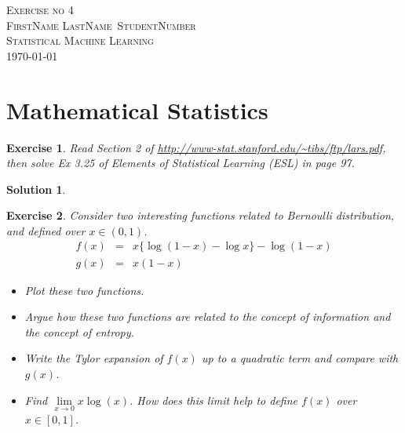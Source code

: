 \documentclass[12pt,a4paper]{article}
\def\StudentName{FirstName LastName}
\def\StudentMatricule{StudentNumber}
\def\ExerciseNo{4}
\newtheorem{exercise}{Exercise}
\numberwithin{exercise}{section} %
\newtheorem{solution}{Solution}
\numberwithin{solution}{section} %
\begin{document}
\begin{titlepage}
\begin{center}
\textsc{\LARGE Exercise no \ExerciseNo}\\[1.5cm]
\vspace{2in}
\textsc{\Large \StudentName~\StudentMatricule}\\[0.5cm]
\textsc{Statistical Machine Learning}\\[0.5cm]
\today
\end{center}
\end{titlepage}



\section{Mathematical Statistics}
\begin{exercise} 
Read Section 2 of \url{http://www-stat.stanford.edu/~tibs/ftp/lars.pdf}, then solve Ex 3.25 of  Elements of Statistical Learning (ESL) in page 97.
\end{exercise}
\begin{solution}
\end{solution}

\begin{exercise}
Consider two interesting functions related to Bernoulli distribution, and defined over  $x\in (0,1)$. 
\begin{eqnarray}
f(x)&=&x\{\log (1-x)-\log x\}- \log(1-x)\\
g(x)&=& x(1-x)
\end{eqnarray}
\begin{itemize}
\item Plot these two functions.
\item Argue how these two functions are related to the concept of information and the concept of entropy.
\item Write the Tylor expansion of $f(x)$ up to a quadratic term and compare with $g(x)$.
\item Find $\lim\limits_{x\to 0} x\log(x)$. How does this limit help to define $f(x)$ over $x\in [0,1]$.
\end{itemize}
\end{exercise}
\end{document}
